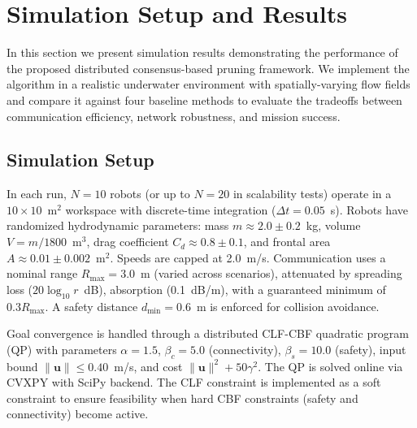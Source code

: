 
\section{Simulation Setup and Results}
\label{sec:results}

In this section we present simulation results demonstrating the performance of the proposed distributed consensus-based pruning framework. We implement the algorithm in a realistic underwater environment with spatially-varying flow fields and compare it against four baseline methods to evaluate the tradeoffs between communication efficiency, network robustness, and mission success.

\subsection{Simulation Setup}

In each run, $N=10$ robots (or up to $N=20$ in scalability tests) operate in a $10 \times 10$~m$^2$ workspace with discrete-time integration ($\Delta t = 0.05$~s). Robots have randomized hydrodynamic parameters: mass $m \approx 2.0 \pm 0.2$~kg, volume $V = m/1800$~m$^3$, drag coefficient $C_d \approx 0.8 \pm 0.1$, and frontal area $A \approx 0.01 \pm 0.002$~m$^2$. Speeds are capped at 2.0~m/s. Communication uses a nominal range $R_{\max} = 3.0$~m (varied across scenarios), attenuated by spreading loss ($20\log_{10}r$~dB), absorption (0.1~dB/m), with a guaranteed minimum of $0.3R_{\max}$. A safety distance $d_{\min} = 0.6$~m is enforced for collision avoidance.

Goal convergence is handled through a distributed CLF-CBF quadratic program (QP) with parameters $\alpha = 1.5$, $\beta_c = 5.0$ (connectivity), $\beta_s = 10.0$ (safety), input bound $\|\mathbf{u}\| \leq 0.40$~m/s, and cost $\|\mathbf{u}\|^2 + 50\gamma^2$. The QP is solved online via CVXPY with SciPy backend. The CLF constraint is implemented as a soft constraint to ensure feasibility when hard CBF constraints (safety and connectivity) become active.

